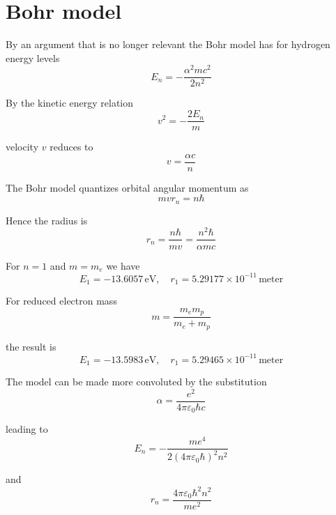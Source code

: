 


\section*{Bohr model}

By an argument that is no longer relevant the Bohr model
has for hydrogen energy levels
\begin{equation*}
E_n=-\frac{\alpha^2mc^2}{2n^2}
\end{equation*}

By the kinetic energy relation
\begin{equation*}
v^2=-\frac{2E_n}{m}
\end{equation*}

velocity $v$ reduces to
\begin{equation*}
v=\frac{\alpha c}{n}
\end{equation*}

The Bohr model quantizes orbital angular momentum as
\begin{equation*}
mvr_n=n\hbar
\end{equation*}

Hence the radius is
\begin{equation*}
r_n=\frac{n\hbar}{mv}=\frac{n^2\hbar}{\alpha mc}
\end{equation*}

For $n=1$ and $m=m_e$ we have
\begin{equation*}
E_1=-13.6057\,\text{eV},\quad
r_1=5.29177\times10^{-11}\,\text{meter}
\end{equation*}

For reduced electron mass
\begin{equation*}
m=\frac{m_em_p}{m_e+m_p}
\end{equation*}

the result is
\begin{equation*}
E_1=-13.5983\,\text{eV},\quad
r_1=5.29465\times10^{-11}\,\text{meter}
\end{equation*}

The model can be made more convoluted by the substitution
\begin{equation*}
\alpha=\frac{e^2}{4\pi\varepsilon_0\hbar c}
\end{equation*}

leading to
\begin{equation*}
E_n=-\frac{me^4}{2(4\pi\varepsilon_0\hbar)^2n^2}
\end{equation*}

and
\begin{equation*}
r_n=\frac{4\pi\varepsilon_0\hbar^2n^2}{me^2}
\end{equation*}


